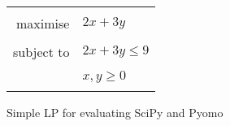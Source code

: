 \renewcommand{\arraystretch}{0.55}
\begin{figure}[H]
    \centering
    \begin{minipage}{0.32\textwidth}
        \begin{tabularx}{\linewidth}{|rl|}
            \hline
            \multicolumn{2}{|X|}{} \tabularnewline
            maximise & $2x + 3y$\tabularnewline
            \hphantom{.......................}&\tabularnewline
            subject to & $2x + 3y \leq 9$\tabularnewline
            &\tabularnewline
            & $x,y \geq 0$\tabularnewline
            &\tabularnewline
            \hline
        \end{tabularx}%
    \end{minipage}
    \caption{Simple LP for evaluating SciPy and Pyomo}
    \label{fig:simple_lp}
\end{figure}
\renewcommand{\arraystretch}{1.0}
